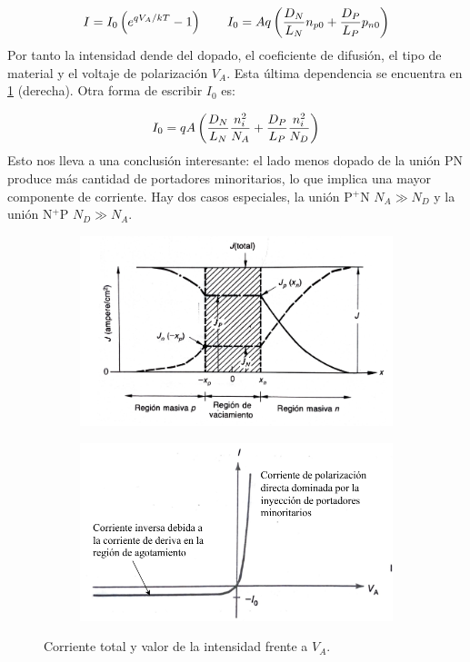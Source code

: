 \begin{equation}
    I = I_0 \left( e^{qV_A/kT}-1 \right) \qquad  I_0 =  A q \left( \frac{D_N}{L_N} n_{p0} + \frac{D_P}{L_P} p_{n0} \right)
\end{equation}
Por tanto la intensidad dende del dopado, el coeficiente de difusión, el tipo de material y el voltaje de polarización $V_A$. Esta última dependencia se encuentra en \cref{Fig:03_03} (derecha). Otra forma de escribir $I_0$ es:

\begin{equation}
    I_0 = qA \left( \frac{D_N}{L_N} \frac{n_i^2}{N_A} + \frac{D_P}{L_P} \frac{n_i^2}{N_D} \right)
\end{equation}
Esto nos lleva a una conclusión interesante: el lado menos dopado de la unión PN produce más cantidad de portadores minoritarios, lo que implica una mayor componente de corriente. Hay dos casos especiales, la unión P$^+$N $N_A \gg N_D $ y la unión N$^+$P $N_D\gg N_A$. 

\begin{figure}[h!]
    \centering
    \begin{subfigure}{0.47\textwidth}
        \includegraphics[width=\textwidth]{Cuerpo/Ch_03/03_Temario_03.png}
    \end{subfigure}
    \begin{subfigure}{0.47\textwidth}
        \includegraphics[width=\textwidth]{Cuerpo/Ch_03/03_Temario_04.png}
    \end{subfigure}
    \label{Fig:03_03}
    \caption{Corriente total y valor de la intensidad frente a $V_A$.}
\end{figure}

